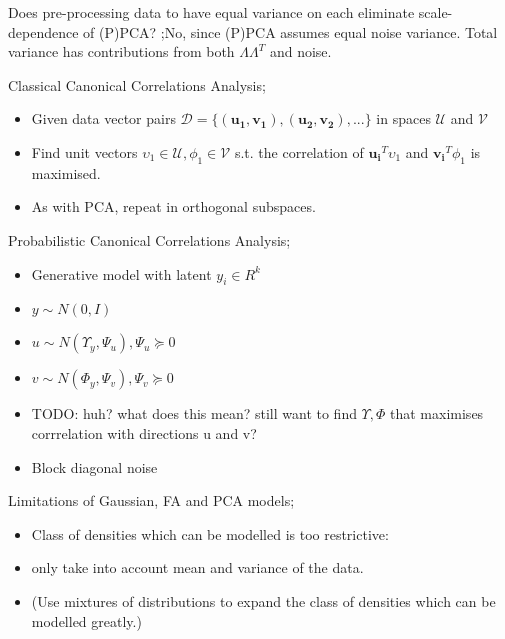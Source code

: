 \documentclass{article}
\begin{document}
Does pre-processing data to have equal variance on each eliminate scale-dependence of (P)PCA? ;No, since (P)PCA assumes equal noise variance. Total variance has contributions from both $\Lambda\Lambda^T$ and noise.

Classical Canonical Correlations Analysis; \begin{itemize}
	\item Given data vector pairs $\mathcal{D}=\{(\mathbf{u_1, v_1}), \mathbf{(u_2, v_2)},...\}$ in spaces $\mathcal{U}$ and $\mathcal{V}$
	\item Find unit vectors $\upsilon_1\in\mathcal{U}, \phi_1\in\mathcal{V}$ s.t. the correlation of $\mathbf{u_i}^T\upsilon_1$ and $\mathbf{v_i}^T\phi_1$ is maximised.
	\item As with PCA, repeat in orthogonal subspaces.
\end{itemize}

Probabilistic Canonical Correlations Analysis; \begin{itemize}
	\item Generative model with latent $y_i\in R^k$
	\item $y\sim N(0,I)$
	\item $u\sim N(\Upsilon_y, \Psi_u), \Psi_u \succeq 0$
	\item $v\sim N(\Phi_y, \Psi_v), \Psi_v \succeq 0$
	\item TODO: huh? what does this mean? still want to find $\Upsilon, \Phi$ that maximises corrrelation with directions u and v? 
	\item Block diagonal noise
\end{itemize}

Limitations of Gaussian, FA and PCA models; \begin{itemize}
	\item Class of densities which can be modelled is too restrictive:
	\item only take into account mean and variance of the data.
	\item (Use mixtures of distributions to expand the class of densities which can be modelled greatly.)
\end{itemize}
\end{document}
